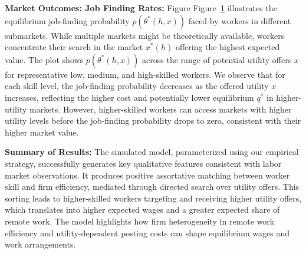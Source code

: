 \documentclass[
  11pt,
  letterpaper,
  DIV=11,
  numbers=noendperiod]{scrartcl}
\theoremstyle{plain}
\theoremstyle{remark}
\begin{document}
\begin{figure}


\caption{\label{fig-job_finding_prob}}

\end{figure}%

\textbf{Market Outcomes: Job Finding Rates:} Figure
Figure~\ref{fig-job_finding_prob} illustrates the equilibrium
job-finding probability \(p(\theta^*(h, x))\) faced by workers in
different submarkets. While multiple markets might be theoretically
available, workers concentrate their search in the market \(x^*(h)\)
offering the highest expected value. The plot shows
\(p(\theta^*(h, x))\) across the range of potential utility offers \(x\)
for representative low, medium, and high-skilled workers. We observe
that for each skill level, the job-finding probability decreases as the
offered utility \(x\) increases, reflecting the higher cost and
potentially lower equilibrium \(q^*\) in higher-utility markets.
However, higher-skilled workers can access markets with higher utility
levels before the job-finding probability drops to zero, consistent with
their higher market value.

\textbf{Summary of Results:} The simulated model, parameterized using
our empirical strategy, successfully generates key qualitative features
consistent with labor market observations. It produces positive
assortative matching between worker skill and firm efficiency, mediated
through directed search over utility offers. This sorting leads to
higher-skilled workers targeting and receiving higher utility offers,
which translates into higher expected wages and a greater expected share
of remote work. The model highlights how firm heterogeneity in remote
work efficiency and utility-dependent posting costs can shape
equilibrium wages and work arrangements.
\end{document}
